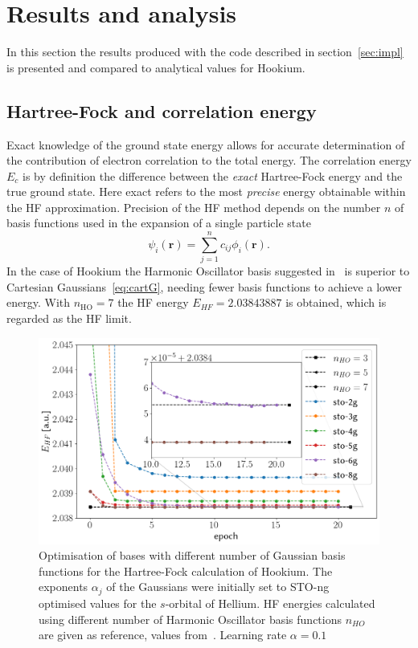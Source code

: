 \documentclass[final,3p,times,twocolumn]{elsarticle}
\begin{document}
	\section{Results and analysis}
	\label{sec:results}
	In this section the results produced with the code described in section~\ref{sec:impl} is presented and compared to analytical values for Hookium.

	\subsection{Hartree-Fock and correlation energy}
	Exact knowledge of the ground state energy allows for accurate determination of the contribution of electron correlation to the total energy. The correlation energy $E_c$ is by definition the difference between the \emph{exact} Hartree-Fock energy and the true ground state. Here exact refers to the most \emph{precise} energy obtainable within the HF approximation. Precision of the HF method depends on the number $n$ of basis functions used in the expansion of a single particle state
	\begin{equation}
		\psi_{i}(\mathbf{r})=\sum_{j=1}^{n} c_{i j} \phi_{i}(\mathbf{r}).
	\end{equation}
	In the case of Hookium the Harmonic Oscillator basis suggested in~\cite{ONeill2003wave} is superior to Cartesian Gaussians~\eqref{eq:cartG}, needing fewer basis functions to achieve a lower energy. With $n_\text{HO}=7$ the HF energy $E_{HF} = 2.03843887$ is obtained, which is regarded as the HF limit. 	
	\begin{figure}[h]
		\centering
		\includegraphics[width=\linewidth]{../plots/HF_optimization}
		\caption{Optimisation of bases with different number of Gaussian basis functions for the Hartree-Fock calculation of Hookium. The exponents $\alpha_{j}$ of the Gaussians were initially set to STO-ng optimised values for the $s$-orbital of Hellium. HF energies calculated using different number of Harmonic Oscillator basis functions $n_{HO}$ are given as reference, values from~\cite{ONeill2003wave}. Learning rate $\alpha=0.1$}
		\label{fig:hfoptimization}
	\end{figure}
\end{document}
